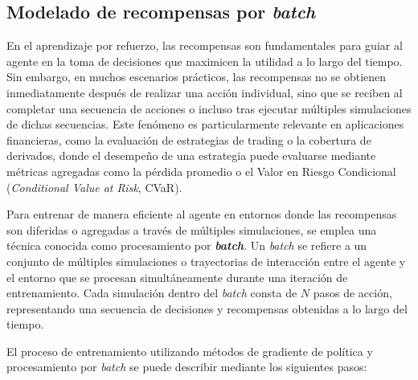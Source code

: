 \documentclass[11pt,a4paper,spanish]{article}
\numberwithin{equation}{section} %
\begin{document}
\subsection{Modelado de recompensas por \textit{batch}}
\label{subsubsec:recompensas_batch}

En el aprendizaje por refuerzo, las recompensas son fundamentales para guiar al agente en la toma de decisiones que maximicen la utilidad a lo largo del tiempo. Sin embargo, en muchos escenarios prácticos, las recompensas no se obtienen inmediatamente después de realizar una acción individual, sino que se reciben al completar una secuencia de acciones o incluso tras ejecutar múltiples simulaciones de dichas secuencias. Este fenómeno es particularmente relevante en aplicaciones financieras, como la evaluación de estrategias de trading o la cobertura de derivados, donde el desempeño de una estrategia puede evaluarse mediante métricas agregadas como la pérdida promedio o el Valor en Riesgo Condicional (\textit{Conditional Value at Risk}, CVaR).

Para entrenar de manera eficiente al agente en entornos donde las recompensas son diferidas o agregadas a través de múltiples simulaciones, se emplea una técnica conocida como procesamiento por \textbf{\textit{batch}}. Un \textit{batch} se refiere a un conjunto de múltiples simulaciones o trayectorias de interacción entre el agente y el entorno que se procesan simultáneamente durante una iteración de entrenamiento. Cada simulación dentro del \textit{batch} consta de \( N \) pasos de acción, representando una secuencia de decisiones y recompensas obtenidas a lo largo del tiempo.

El proceso de entrenamiento utilizando métodos de gradiente de política y procesamiento por \textit{batch} se puede describir mediante los siguientes pasos:
\end{document}
